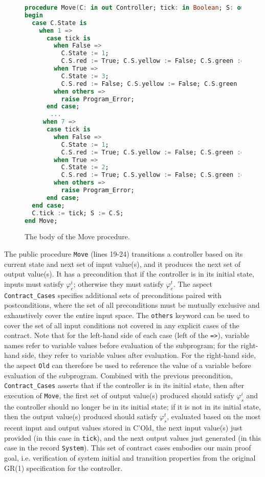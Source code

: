 \documentclass[runningheads]{llncs}
\begin{document}
\begin{figure}
\begin{lstlisting}[language={Ada}, basicstyle=\scriptsize]  
procedure Move(C: in out Controller; tick: in Boolean; S: out System) is
begin
  case C.State is
    when 1 =>
      case tick is
        when False =>
          C.State := 1; 
          C.S.red := True; C.S.yellow := False; C.S.green := False;
        when True =>
          C.State := 3; 
          C.S.red := False; C.S.yellow := False; C.S.green := True;
        when others =>
          raise Program_Error;
      end case;
       ...      
     when 7 =>
      case tick is
        when False =>
          C.State := 1; 
          C.S.red := True; C.S.yellow := False; C.S.green := False;
        when True => 
          C.State := 2; 
          C.S.red := True; C.S.yellow := False; C.S.green := False;
        when others =>
          raise Program_Error;
      end case;
  end case;
  C.tick := tick; S := C.S;
end Move;
\end{lstlisting}
  \caption{The body of the Move procedure.}
  \label{fig:moveBody}
\end{figure}

The public procedure \lstinline{Move} (lines 19-24) transitions a controller based on its current state and 
next set of input value(s), and it produces the next set of output value(s). 
It has a precondition that if the controller is in its initial state, 
inputs must satisfy $\varphi_e^i$; otherwise they must satisfy $\varphi_e^t$.
The aspect \lstinline{Contract_Cases} specifies additional sets of preconditions paired with postconditions, 
where the set of all preconditions must be mutually exclusive and exhaustively cover the entire input space.
The \lstinline{others} keyword can be used to cover the set of all input conditions not covered in any explicit cases of the contract. 
Note that for the left-hand side of each case (left of the \lstinline{=>}), variable names refer to variable values before evaluation of the subprogram; 
for the right-hand side, they refer to variable values after evaluation.
For the right-hand side, the aspect \lstinline{Old} can therefore be used to reference the value of a variable before evaluation of the subprogram. 
Combined with the previous precondition, \lstinline{Contract_Cases} asserts that if the controller is in its initial state, then after execution of \lstinline{Move}, 
the first set of output value(s) produced should satisfy $\varphi_s^i$ and the controller should no longer be in its initial state; 
if it is not in its initial state, then the output value(s) produced should satisfy $\varphi_s^t$, 
evaluated based on the most recent input and output values stored in C'Old, the next input value(s) just provided (in this case in \lstinline{tick}), 
and the next output values just generated (in this case in the record \lstinline{System}). 
This set of contract cases embodies our main proof goal, i.e. verification of system initial and transition properties from the original GR(1) specification for the controller. 
\end{document}
